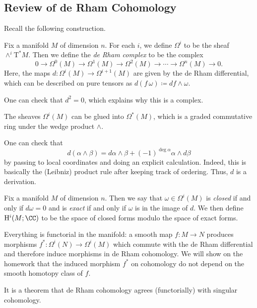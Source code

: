 \documentclass[../notes.tex]{subfiles}
\begin{document}
\subsection{Review of de Rham Cohomology}
Recall the following construction.
\begin{definition}
	Fix a manifold $M$ of dimension $n$. For each $i$, we define $\Omega^i$ to be the sheaf $\land^i\mathrm T^*M$. Then we define the \textit{de Rham complex} to be the complex
	\[0\to\Omega^0(M)\to\Omega^1(M)\to\Omega^2(M)\to\cdots\to\Omega^n(M)\to0.\]
	Here, the maps $d\colon\Omega^i(M)\to\Omega^{i+1}(M)$ are given by the de Rham differential, which can be described on pure tensors as $d(f\,\omega)\coloneqq df\land\omega$.
\end{definition}
\begin{remark}
	One can check that $d^2=0$, which explains why this is a complex.
\end{remark}
\begin{remark}
	The sheaves $\Omega^i(M)$ can be glued into $\Omega^*(M)$, which is a graded commutative ring under the wedge product $\land$.
\end{remark}
\begin{remark}
	One can check that
	\[d(\alpha\land\beta)=d\alpha\land\beta+(-1)^{\deg\alpha}\alpha\land d\beta\]
	by passing to local coordinates and doing an explicit calculation. Indeed, this is basically the (Leibniz) product rule after keeping track of ordering. Thus, $d$ is a derivation.
\end{remark}
\begin{definition}
	Fix a manifold $M$ of dimension $n$. Then we say that $\omega\in\Omega^i(M)$ is \textit{closed} if and only if $d\omega=0$ and is \textit{exact} if and only if $\omega$ is in the image of $d$. We then define $\mathrm H^i(M;\CC)$ to be the space of closed forms modulo the space of exact forms.
\end{definition}
\begin{remark} \label{rem:functorial-cohomology}
	Everything is functorial in the manifold: a smooth map $f\colon M\to N$ produces morphisms $f^*\colon\Omega^i(N)\to\Omega^i(M)$ which commute with the de Rham differential and therefore induce morphisms in de Rham cohomology. We will show on the homework that the induced morphism $f^*$ on cohomology do not depend on the smooth homotopy class of $f$.
\end{remark}
\begin{remark}
	It is a theorem that de Rham cohomology agrees (functorially) with singular cohomology.
\end{remark}
\end{document}
